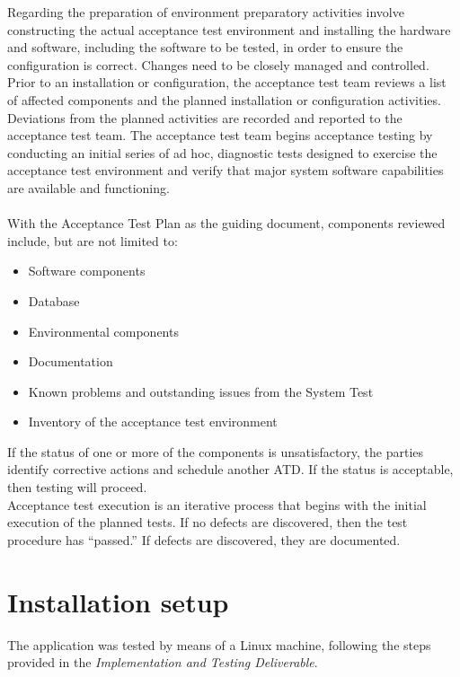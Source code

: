 \documentclass[a4paper, hidelinks, 12pt]{report}
\begin{document}
Regarding the preparation of environment preparatory activities involve constructing the actual acceptance test environment and installing the hardware and software, including the software to be tested, in order to ensure the configuration is correct.  Changes need to be closely managed and controlled. Prior to an installation or configuration, the acceptance test team reviews a list of affected components and the planned installation or configuration activities.  Deviations from the planned activities are recorded and reported to the acceptance test team.  The acceptance test team begins acceptance testing by conducting an initial series of ad hoc, diagnostic tests designed to exercise the acceptance test environment and verify that major system software capabilities are available and functioning.\\\\
With the Acceptance Test Plan as the guiding document, components reviewed include, but are not limited to:
\begin{itemize}
\item{}Software components
\item{}Database
\item{}Environmental components
\item{}Documentation
\item{}Known problems and outstanding issues from the System Test
\item{}Inventory of the acceptance test environment

\end{itemize}
If the status of one or more of the components is unsatisfactory, the parties identify corrective actions and schedule another ATD.  If the status is acceptable, then testing will proceed.\\

Acceptance test execution is an iterative process that begins with the initial execution of the planned tests.  If no defects are discovered, then the test procedure has “passed.” If defects are discovered, they are documented.

	\chapter{Installation setup}

	The application was tested by means of a Linux machine, following the steps provided in the \textit{Implementation and Testing Deliverable}. 
	
\end{document}
